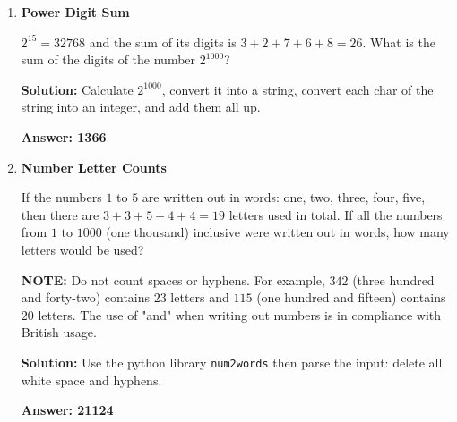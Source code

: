 \documentclass[12pt]{article}
\begin{document}
\begin{enumerate}
    \item \textbf{Power Digit Sum}
    \par $2^{15} = 32768$ and the sum of its digits is $3+2+7+6+8 = 26$. What is the sum of the digits of the number $2^{1000}$?

    \par \textbf{Solution:} Calculate $2^{1000}$, convert it into a string, convert each char of the string into an integer, and add them all up.

    \par \textbf{Answer: 1366}

    \item \textbf{Number Letter Counts}
    \par If the numbers $1$ to $5$ are written out in words: one, two, three, four, five, then there are $3 + 3 + 5 + 4 + 4 = 19$ letters used in total. If all the numbers from $1$ to $1000$ (one thousand) inclusive were written out in words, how many letters would be used? 
    \par \textbf{NOTE:} Do not count spaces or hyphens. For example, $342$ (three hundred and forty-two) contains $23$ letters and $115$ (one hundred and fifteen) contains $20$ letters. The use of "and" when writing out numbers is in compliance with British usage. 

    \par \textbf{Solution:} Use the python library \texttt{num2words} then parse the input: delete all white space and hyphens.

    \par \textbf{Answer: 21124}
    



    
\end{enumerate}
\end{document}
